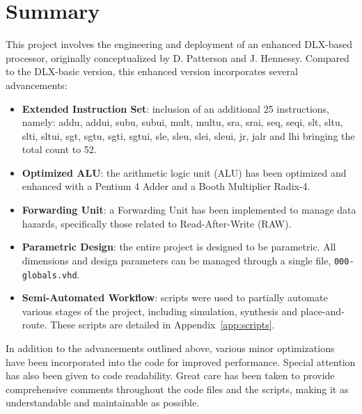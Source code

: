 \chapter*{Summary}
\label{chap:summary}

This project involves the engineering and deployment of an enhanced DLX-based processor, originally conceptualized by D. Patterson and J. Hennessy. Compared to the DLX-basic version, this enhanced version incorporates several advancements:

\begin{itemize}
    \item \textbf{Extended Instruction Set}: inclusion of an additional 25 instructions, namely: addu, addui, subu, subui, mult, multu, sra, srai, seq, seqi, slt, sltu, slti, sltui, sgt, sgtu, sgti, sgtui, sle, sleu, slei, sleui, jr, jalr and lhi bringing the total count to 52. %
    \item \textbf{Optimized ALU}: the arithmetic logic unit (ALU) has been optimized and enhanced with a Pentium 4 Adder and a Booth Multiplier Radix-4.
    \item \textbf{Forwarding Unit}: a Forwarding Unit has been implemented to manage data hazards, specifically those related to Read-After-Write (RAW).
    \item \textbf{Parametric Design}: the entire project is designed to be parametric. All dimensions and design parameters can be managed through a single file, \texttt{000-globals.vhd}.
    \item \textbf{Semi-Automated Workflow}: scripts were used to partially automate various stages of the project, including simulation, synthesis and place-and-route. These scripts are detailed in Appendix~\ref{app:scripts}.

\end{itemize}

In addition to the advancements outlined above, various minor optimizations have been incorporated into the code for improved performance. Special attention has also been given to code readability. Great care has been taken to provide comprehensive comments throughout the code files and the scripts, making it as understandable and maintainable as possible.
